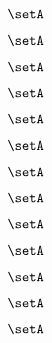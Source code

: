\begin{forslides}
    \begin{equation}
        \label{eq:slides-translation-80}
        \setA
    \end{equation}

    \begin{equation}
        \label{eq:slides-translation-81}
        \setA
    \end{equation}

    \begin{equation}
        \label{eq:slides-translation-82}
        \setA
    \end{equation}

    \begin{equation}
        \label{eq:slides-translation-83}
        \setA
    \end{equation}

    \begin{equation}
        \label{eq:slides-translation-84}
        \setA
    \end{equation}

    \begin{equation}
        \label{eq:slides-translation-85}
        \setA
    \end{equation}

    \begin{equation}
        \label{eq:slides-translation-86}
        \setA
    \end{equation}

    \begin{equation}
        \label{eq:slides-translation-87}
        \setA
    \end{equation}

    \begin{equation}
        \label{eq:slides-translation-88}
        \setA
    \end{equation}

    \begin{equation}
        \label{eq:slides-translation-89}
        \setA
    \end{equation}
    
    \begin{equation}
        \label{eq:slides-translation-90}
        \setA
    \end{equation}

    \begin{equation}
        \label{eq:slides-translation-91}
        \setA
    \end{equation}

    \begin{equation}
        \label{eq:slides-translation-92}
        \setA
    \end{equation}


\end{forslides}
